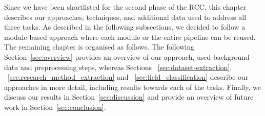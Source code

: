 Since we have been shortlisted for the second phase of the RCC, this chapter describes our approaches, techniques, and additional data used to address all three tasks. As described in the following subsections, we decided to follow a module-based approach where each module or the entire pipeline can be reused. The remaining chapter is organised as follows.
The following Section~\ref{sec:overview} provides an overview of our approach, used background data and preprocessing steps, whereas Sections ~\ref{sec:dataset-extraction}, ~\ref{sec:research_method_extraction} and ~\ref{sec:field_classification} describe our approaches in more detail, including results towards each of the tasks. Finally, we discuss our results in Section~\ref{sec:discussion} and provide an overview of future work in Section~\ref{sec:conclusion}.



